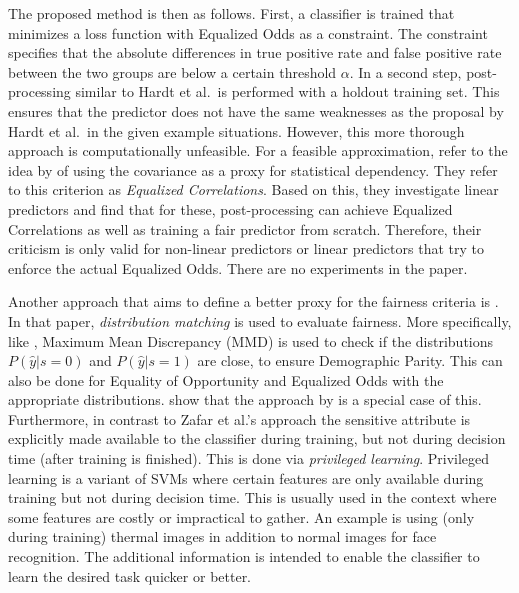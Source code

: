 The proposed method is then as follows. First, a classifier is trained that minimizes a
loss function with Equalized Odds as a constraint. The constraint specifies that the
absolute differences in true positive rate and false positive rate between the two groups
are below a certain threshold \(\alpha\). In a second step, post-processing similar to Hardt
et al.~is performed with a holdout training set. This ensures that the predictor does not
have the same weaknesses as the proposal by Hardt et al.~in the given example situations.
However, this more thorough approach is computationally unfeasible.
For a feasible approximation,
\citet{woodworth2017learning} refer to the idea by \citet{zafar2017fairnesstreatment}
of using the covariance as a proxy for statistical
dependency. They refer to this criterion as \emph{Equalized Correlations}. Based on this, they
investigate linear predictors and find that for these, post-processing can achieve
Equalized Correlations as well as training a fair predictor from scratch. Therefore, their
criticism is only valid for non-linear predictors or linear predictors that try to enforce
the actual Equalized Odds. There are no experiments in the paper.

Another approach that aims to define a better proxy for the fairness criteria is \citet{quadrianto2017recycling}.
In that paper, \emph{distribution matching} is used to evaluate fairness.
More specifically, like \citet{louizos2015variational}, Maximum Mean Discrepancy (MMD) is used to check if the
distributions \(P(\hat{y}|s=0)\) and \(P(\hat{y}|s=1)\) are close, to ensure Demographic
Parity. This can also be done for Equality of Opportunity and Equalized Odds with the
appropriate distributions.
\citet{quadrianto2017recycling} show that the approach by \citet{zafar2017fairnessconstraints} is a special case of this.
Furthermore, in contrast to Zafar et al.'s approach the
sensitive attribute is explicitly made available to the classifier during training, but
not during decision time (after training is finished). This is done via \emph{privileged
learning}. Privileged learning is a variant of SVMs where certain features are only
available during training but not during decision time. This is usually used in the
context where some features are costly or impractical to gather. An example is using (only
during training) thermal images in addition to normal images for face recognition. The
additional information is intended to enable the classifier to learn the desired task
quicker or better.

